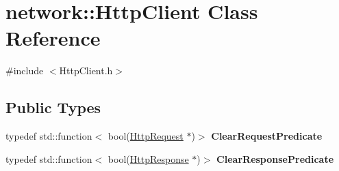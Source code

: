 \hypertarget{classnetwork_1_1HttpClient}{}\section{network\+:\+:Http\+Client Class Reference}
\label{classnetwork_1_1HttpClient}


{\ttfamily \#include $<$Http\+Client.\+h$>$}

\subsection*{Public Types}
\begin{DoxyCompactItemize}
\item 
\mbox{\label{classnetwork_1_1HttpClient_a9f36661fe77f479f5c66137f724013ac}} 
typedef std\+::function$<$ bool(\hyperlink{classnetwork_1_1HttpRequest}{Http\+Request} $\ast$)$>$ {\bfseries Clear\+Request\+Predicate}
\item 
\mbox{\label{classnetwork_1_1HttpClient_a1bce5b4009f9fb4be72b6c67e381b55a}} 
typedef std\+::function$<$ bool(\hyperlink{classnetwork_1_1HttpResponse}{Http\+Response} $\ast$)$>$ {\bfseries Clear\+Response\+Predicate}
\end{DoxyCompactItemize}
